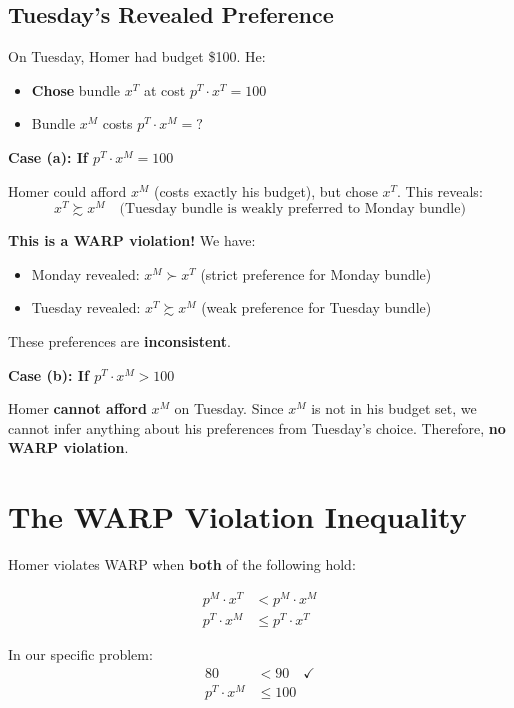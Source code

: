 \documentclass[11pt]{article}
\begin{document}
\subsection{Tuesday's Revealed Preference}

On Tuesday, Homer had budget \$100. He:
\begin{itemize}
    \item \textbf{Chose} bundle $x^T$ at cost $p^T \cdot x^T = 100$
    \item Bundle $x^M$ costs $p^T \cdot x^M = ?$
\end{itemize}

\textbf{Case (a): If $p^T \cdot x^M = 100$}

Homer could afford $x^M$ (costs exactly his budget), but chose $x^T$. This reveals:
\[
x^T \succsim x^M \quad \text{(Tuesday bundle is weakly preferred to Monday bundle)}
\]

\textbf{This is a WARP violation!} We have:
\begin{itemize}
    \item Monday revealed: $x^M \succ x^T$ (strict preference for Monday bundle)
    \item Tuesday revealed: $x^T \succsim x^M$ (weak preference for Tuesday bundle)
\end{itemize}

These preferences are \textbf{inconsistent}.

\textbf{Case (b): If $p^T \cdot x^M > 100$}

Homer \textbf{cannot afford} $x^M$ on Tuesday. Since $x^M$ is not in his budget set, we cannot infer anything about his preferences from Tuesday's choice. Therefore, \textbf{no WARP violation}.

\section{The WARP Violation Inequality}

Homer violates WARP when \textbf{both} of the following hold:

\begin{align}
p^M \cdot x^T &< p^M \cdot x^M \tag{Monday reveals $x^M \succ x^T$} \\
p^T \cdot x^M &\leq p^T \cdot x^T \tag{Tuesday reveals $x^T \succsim x^M$}
\end{align}

In our specific problem:
\begin{align}
80 &< 90 \quad \checkmark \tag{Monday condition satisfied} \\
p^T \cdot x^M &\leq 100 \tag{Tuesday condition - when does this hold?}
\end{align}
\end{document}
